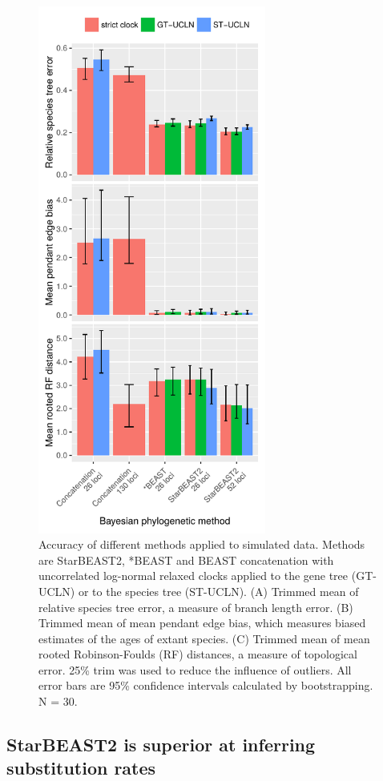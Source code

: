 \documentclass[12pt]{article}
\begin{document}
\begin{figure}[htb!]
\centering
\includegraphics[width=75mm]{tree_error.pdf}
\caption
{Accuracy of different methods applied to simulated data. Methods are StarBEAST2,
*BEAST and BEAST concatenation with uncorrelated log-normal relaxed clocks applied
to the gene tree (GT-UCLN) or to the species tree (ST-UCLN). (A) Trimmed mean of
relative species tree error, a measure of branch length error. (B) Trimmed
mean of mean pendant edge bias, which measures biased estimates of the ages of
extant species. (C) Trimmed mean of mean rooted Robinson-Foulds (RF) distances, a
measure of topological error. 25\% trim was used to reduce the
influence of outliers. All error bars are 95\% confidence intervals calculated
by bootstrapping. N = 30.}
\label{fig:speciesTreeError}
\end{figure}

\clearpage

\subsection{StarBEAST2 is superior at inferring substitution rates}
\end{document}
